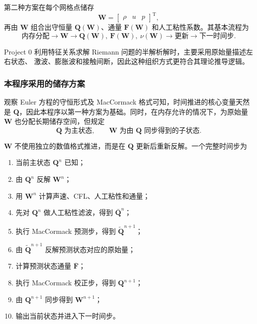 第二种方案在每个网格点储存
\begin{equation}
\bm{W}=
\begin{bmatrix}
\rho & u & p
\end{bmatrix}^{\mathrm T},
\end{equation}
再由 $\bm{W}$ 组合出守恒量 $\bm{Q}(\bm{W})$、通量
$\bm{F}(\bm{W})$ 和人工粘性系数。其基本流程为
\begin{equation}
\text{内存分配}
\longrightarrow
\bm{W}
\longrightarrow
\bm{Q}(\bm{W}),\ \bm{F}(\bm{W}),\ \nu(\bm{W})
\longrightarrow
\text{更新}
\longrightarrow
\text{下一时间步}.
\end{equation}

Project 0 利用特征关系求解 Riemann 问题的半解析解时，主要采用原始量描述左右状态、
激波、膨胀波和接触间断，因此这种组织方式更符合其理论推导逻辑。

\subsubsection{本程序采用的储存方案}

观察 Euler 方程的守恒形式及 MacCormack 格式可知，时间推进的核心变量天然是
$\bm{Q}$，因此本程序以第一种方案为基础。同时，在内存允许的情况下，为原始量
$\bm{W}$ 也分配长期储存空间，但规定
\begin{equation}
\bm{Q}\text{ 为主状态},
\qquad
\bm{W}\text{ 为由 }\bm{Q}\text{ 同步得到的子状态}.
\end{equation}

$\bm{W}$ 不使用独立的数值格式推进，而是在 $\bm{Q}$ 更新后重新反解。一个完整时间步为
\begin{enumerate}[leftmargin=2em]
    \item 当前主状态 $\bm{Q}^{n}$ 已知；
    \item 由 $\bm{Q}^{n}$ 反解 $\bm{W}^{n}$；
    \item 用 $\bm{W}^{n}$ 计算声速、CFL、人工粘性和通量；
    \item 先对 $\bm{Q}^{n}$ 做人工粘性滤波，得到 $\bar{\bm{Q}}^{n}$；
    \item 执行 MacCormack 预测步，得到 $\widetilde{\bm{Q}}^{n+1}$；
    \item 由 $\widetilde{\bm{Q}}^{n+1}$ 反解预测状态对应的原始量；
    \item 计算预测状态通量 $\overline{\bm{F}}$；
    \item 执行 MacCormack 校正步，得到 $\bm{Q}^{n+1}$；
    \item 由 $\bm{Q}^{n+1}$ 同步得到 $\bm{W}^{n+1}$；
    \item 输出当前状态并进入下一时间步。
\end{enumerate}


